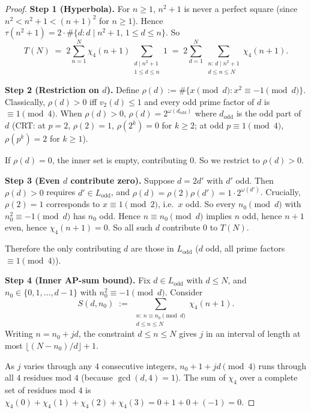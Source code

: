 \documentclass[11pt]{article}
\begin{document}
\begin{proof}
\textbf{Step 1 (Hyperbola).} For $n \ge 1$, $n^2+1$ is never a perfect square
(since $n^2 < n^2+1 < (n+1)^2$ for $n \ge 1$). Hence
$\tau(n^2+1) = 2 \cdot \#\{d : d \mid n^2+1,\, 1 \le d \le n\}$. So
\[
T(N) \;=\; 2 \sum_{n=1}^N \chi_4(n+1) \sum_{\substack{d \mid n^2+1 \\ 1 \le d \le n}} 1
\;=\; 2 \sum_{d=1}^N \sum_{\substack{n:\, d \mid n^2+1 \\ d \le n \le N}} \chi_4(n+1).
\]

\noindent\textbf{Step 2 (Restriction on $d$).} Define
$\rho(d) := \#\{x \pmod d : x^2 \equiv -1 \pmod d\}$. Classically,
$\rho(d) > 0$ iff $v_2(d) \le 1$ and every odd prime factor of $d$ is
$\equiv 1 \pmod 4$. When $\rho(d) > 0$,
$\rho(d) = 2^{\omega(d_{\mathrm{odd}})}$ where $d_{\mathrm{odd}}$ is the odd
part of $d$ (CRT: at $p = 2$, $\rho(2) = 1$, $\rho(2^k) = 0$ for $k \ge 2$;
at odd $p \equiv 1 \pmod 4$, $\rho(p^k) = 2$ for $k \ge 1$).

If $\rho(d) = 0$, the inner set is empty, contributing $0$. So we restrict to
$\rho(d) > 0$.

\medskip
\noindent\textbf{Step 3 (Even $d$ contribute zero).} Suppose $d = 2 d'$ with
$d'$ odd. Then $\rho(d) > 0$ requires $d' \in L_{\mathrm{odd}}$, and
$\rho(d) = \rho(2)\rho(d') = 1 \cdot 2^{\omega(d')}$. Crucially, $\rho(2) = 1$
corresponds to $x \equiv 1 \pmod 2$, i.e.\ $x$ odd. So every $n_0 \pmod d$
with $n_0^2 \equiv -1 \pmod d$ has $n_0$ odd. Hence $n \equiv n_0 \pmod d$
implies $n$ odd, hence $n+1$ even, hence $\chi_4(n+1) = 0$. So all such $d$
contribute $0$ to $T(N)$.

Therefore the only contributing $d$ are those in $L_{\mathrm{odd}}$ ($d$ odd,
all prime factors $\equiv 1 \pmod 4$).

\medskip
\noindent\textbf{Step 4 (Inner AP-sum bound).} Fix $d \in L_{\mathrm{odd}}$
with $d \le N$, and $n_0 \in \{0, 1, \dots, d-1\}$ with
$n_0^2 \equiv -1 \pmod d$. Consider
\[
S(d, n_0) \;:=\; \sum_{\substack{n:\, n \equiv n_0 \pmod d \\ d \le n \le N}} \chi_4(n+1).
\]
Writing $n = n_0 + j d$, the constraint $d \le n \le N$ gives $j$ in an
interval of length at most $\lfloor (N - n_0)/d \rfloor + 1$.

As $j$ varies through any $4$ consecutive integers, $n_0 + 1 + jd \pmod 4$
runs through all $4$ residues mod $4$ (because $\gcd(d, 4) = 1$). The sum of
$\chi_4$ over a complete set of residues mod $4$ is
$\chi_4(0) + \chi_4(1) + \chi_4(2) + \chi_4(3) = 0 + 1 + 0 + (-1) = 0$.


\end{proof}
\end{document}
